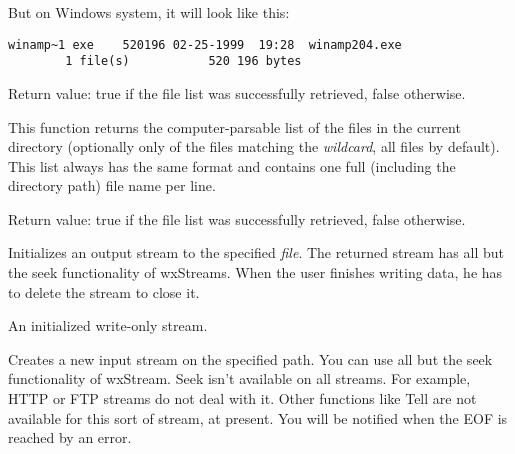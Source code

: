 But on Windows system, it will look like this:

\begin{verbatim}
winamp~1 exe    520196 02-25-1999  19:28  winamp204.exe
        1 file(s)           520 196 bytes
\end{verbatim}

Return value: true if the file list was successfully retrieved, false
otherwise.




\label{wxftpgetfileslist}


This function returns the computer-parsable list of the files in the current
directory (optionally only of the files matching the {\it wildcard}, all files
by default). This list always has the same format and contains one full
(including the directory path) file name per line.

Return value: true if the file list was successfully retrieved, false
otherwise.



\label{wxftpgetoutputstream}


Initializes an output stream to the specified {\it file}. The returned
stream has all but the seek functionality of wxStreams. When the user finishes
writing data, he has to delete the stream to close it.


An initialized write-only stream.





\label{wxftpgetinputstream}


Creates a new input stream on the specified path. You can use all but the seek
functionality of wxStream. Seek isn't available on all streams. For example,
HTTP or FTP streams do not deal with it. Other functions like Tell
are not available for this sort of stream, at present.
You will be notified when the EOF is reached by an error.

